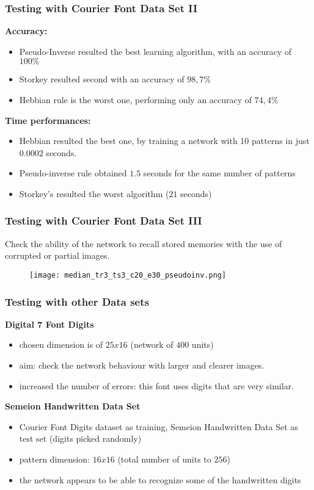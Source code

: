 \documentclass{beamer}
\begin{document}

\begin{frame}
\frametitle{Testing with Courier Font Data Set II}
\textbf{Accuracy:}
\begin{itemize}
\item Pseudo-Inverse resulted the best learning algorithm, with an accuracy of $100\%$
\item Storkey resulted second with an accuracy of $98,7\%$
\item Hebbian rule is the worst one, performing only an accuracy of $74,4\%$
\end{itemize}
\textbf{Time performances:} 
\begin{itemize}
\item Hebbian resulted the best one, by training a network with 10 patterns in just $0.0002$ seconds. 
\item Pseudo-inverse rule obtained $1.5$ seconds for the same number of patterns
\item Storkey's resulted the worst algorithm ($21$ seconds)
\end{itemize}
\end{frame}


\begin{frame}
\frametitle{Testing with Courier Font Data Set III}
Check the ability of the network to recall stored memories with the use of corrupted or partial images.
\begin{figure}
\texttt{[image: median\_tr3\_ts3\_c20\_e30\_pseudoinv.png]}
\end{figure}
\end{frame}


\begin{frame}
\frametitle{Testing with other Data sets}
\textbf{Digital 7 Font Digits}
\begin{itemize}
\item chosen dimension is of $25x16$ (network of $400$ units) 
\item aim: check the network behaviour with larger and clearer images. 
\item increased the number of errors: this font uses digits that are very similar. 
\end{itemize} 
\textbf{Semeion Handwritten Data Set}
\begin{itemize}
\item Courier Font Digits dataset as training, Semeion Handwritten Data Set as test set (digits picked randomly)
\item pattern dimension: $16x16$ (total number of units to $256$)
\item the network appears to be able to recognize some of the handwritten digits
\end{itemize}
\end{frame}
\end{document}
